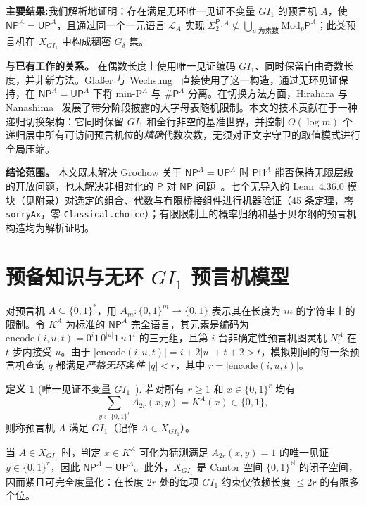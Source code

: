 \documentclass[11pt,a4paper]{article}
\theoremstyle{definition}
\newtheorem{definition}[theorem]{定义}
\theoremstyle{remark}
\newcommand{\Pcl}{\mathsf{P}}
\newcommand{\NP}{\mathsf{NP}}
\newcommand{\UP}{\mathsf{UP}}
\newcommand{\PH}{\mathsf{PH}}
\newcommand{\Modp}{\mathrm{Mod}_p\mathsf{P}}
\newcommand{\SharpP}{\#\mathsf{P}}
\newcommand{\SigTwo}{\Sigma_2^{\mathsf{P}}}
\newcommand{\GI}{GI_1}
\newcommand{\takeaway}[2]{%
  \vspace{4pt}\noindent\colorbox{primary!7}{%
    \parbox{\dimexpr\linewidth-2\fboxsep\relax}{%
      \vspace{3pt}\textbf{\color{primary}#1:}\hspace{0.4em}#2\vspace{3pt}%
    }%
  }\vspace{4pt}%
}
\begin{document}
\takeaway{主要结果}{我们解析地证明：存在满足无环唯一见证不变量 $\GI$ 的预言机 $A$，使 $\NP^A = \UP^A$，且通过同一个一元语言 $\mathcal{L}_A$ 实现 $\SigTwo{}^{,A} \not\subseteq \bigcup_{p\text{ 为素数}} \Modp^A$；此类预言机在 $X_{\GI}$ 中构成稠密 $G_\delta$ 集。}

\textbf{与已有工作的关系。} 在偶数长度上使用唯一见证编码 $\GI$、同时保留自由奇数长度，并非新方法。Gla\ss er 与 Wechsung~\cite{GlasserWechsung2003} 直接使用了这一构造，通过无环见证保持，在 $\NP^A = \UP^A$ 下将 $\mathrm{min\text{-}P}^A$ 与 $\SharpP^A$ 分离。在切换方法方面，Hirahara 与 Nanashima~\cite{HiraharaNanashima2021} 发展了带分阶段披露的大字母表随机限制。本文的技术贡献在于一种递归切换架构：它同时保留 $\GI$ 和全行非空的基准世界，并控制 $O(\log m)$ 个递归层中所有可访问预言机位的\emph{精确}代数次数，无须对正文字守卫的取值模式进行全局压缩。

\textbf{结论范围。} 本文既未解决 Grochow 关于 $\NP^A = \UP^A$ 时 $\PH^A$ 能否保持无限层级的开放问题，也未解决非相对化的 $\Pcl$ 对 $\NP$ 问题~\cite{Cook2000,RazborovRudich1997}。七个无导入的 Lean~4.36.0 模块（见附录）对选定的组合、代数与有限桥接组件进行机器验证（45 条定理，零 \texttt{sorryAx}，零 \texttt{Classical.choice}）；有限限制上的概率归纳和基于贝尔纲的预言机构造均为解析证明。

\section{预备知识与无环 \texorpdfstring{$\GI$}{GI1} 预言机模型}

对预言机 $A \subseteq \{0,1\}^*$，用 $A_m : \{0,1\}^m \to \{0,1\}$ 表示其在长度为 $m$ 的字符串上的限制。令 $K^A$ 为标准的 $\NP^A$ 完全语言，其元素是编码为 $\mathrm{encode}(i,u,t)=0^i1\,0^{|u|}1\,u\,1^t$ 的三元组，且第 $i$ 台非确定性预言机图灵机 $N_i^A$ 在 $t$ 步内接受 $u$。由于 $|\mathrm{encode}(i,u,t)| = i+2|u|+t+2>t$，模拟期间的每一条预言机查询 $q$ 都满足\emph{严格无环条件} $|q|<r$，其中 $r=|\mathrm{encode}(i,u,t)|$。

\begin{definition}[唯一见证不变量 $\GI$~\cite{GlasserWechsung2003}]
若对所有 $r \ge 1$ 和 $x \in \{0,1\}^r$ 均有
\[
  \sum_{y \in \{0,1\}^r} A_{2r}(x, y) = K^A(x) \in \{0,1\},
\]
则称预言机 $A$ 满足 $\GI$（记作 $A\in X_{\GI}$）。
\end{definition}

当 $A\in X_{\GI}$ 时，判定 $x\in K^A$ 可化为猜测满足 $A_{2r}(x,y)=1$ 的唯一见证 $y\in\{0,1\}^r$，因此 $\NP^A=\UP^A$。此外，$X_{\GI}$ 是 Cantor 空间 $\{0,1\}^{\mathbb N}$ 的闭子空间，因而紧且可完全度量化：在长度 $2r$ 处的每项 $\GI$ 约束仅依赖长度 $\le 2r$ 的有限多个位。
\end{document}
